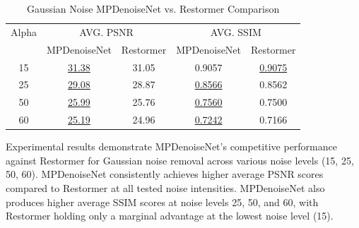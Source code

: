 \begin{table}[H]
    \centering
    \begin{tabular}{ccccc}
        \hline
        Alpha & \multicolumn{2}{c}{AVG. PSNR} & \multicolumn{2}{c}{AVG. SSIM} \\
              & MPDenoiseNet             & Restormer & MPDenoiseNet & Restormer \\
        \hline
        15    & \underline{31.38}   & 31.05     & 0.9057  & \underline{0.9075}  \\
        25    & \underline{29.08}   & 28.87     & \underline{0.8566}  & 0.8562  \\
        50    & \underline{25.99}   & 25.76     & \underline{0.7560}  & 0.7500  \\
        60    & \underline{25.19}   & 24.96     & \underline{0.7242}  & 0.7166  \\
        \hline
    \end{tabular}
    \caption{Gaussian Noise MPDenoiseNet vs. Restormer Comparison}
\end{table}

Experimental results demonstrate MPDenoiseNet's competitive performance against Restormer for Gaussian noise removal across various noise levels (15, 25, 50, 60). MPDenoiseNet consistently achieves higher average PSNR scores compared to Restormer at all tested noise intensities. MPDenoiseNet also produces higher average SSIM scores at noise levels 25, 50, and 60, with Restormer holding only a marginal advantage at the lowest noise level (15).